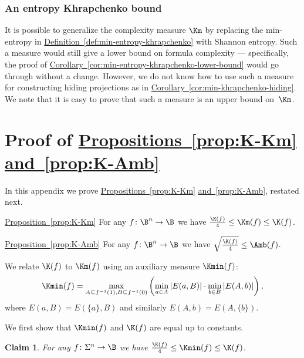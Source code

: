 \documentclass[11pt]{article}
\numberwithin{equation}{section}
\newtheorem{claim}[theorem]{Claim}
\theoremstyle{definition}
\theoremstyle{plain}
\newcommand{\expref}[2]{\hyperref[#2]{#1~\ref{#2}}}
\theoremstyle{definition}\newtheorem{notation}[theorem]{Notation}\theoremstyle{plain}
\begin{document}
%
%
\subsubsection{An entropy Khrapchenko bound}  %

It is possible to generalize the complexity measure $\Km$ by replacing
the min-entropy in \expref{Definition}{def:min-entropy-khrapchenko} 
with Shannon entropy.
Such a measure would still %
give a lower bound on %
formula complexity --- specifically,
the proof of \expref{Corollary}{cor:min-entropy-khrapchenko-lower-bound} 
would go through
without a change. However, we do not know how to use such a measure
for constructing hiding projections as in 
\expref{Corollary}{cor:min-khrapchenko-hiding}.
We note that it is easy to prove that such a measure is an upper bound
on~$\Km$.

\section{\label{sec:K-Km}Proof of \expref{Propositions}{prop:K-Km}
  \expref{and}{prop:K-Amb}}

In this appendix we prove \expref{Propositions}{prop:K-Km}
  \expref{and}{prop:K-Amb}, restated next. 
\begin{restated}{\expref{Proposition}{prop:K-Km}}
For any $f\colon\B^{n}\to\B$ we have $\tfrac{\K(f)}{4}\le\Km(f)\le\K(f)$. 
\end{restated}

\begin{restated}{\expref{Proposition}{prop:K-Amb}}
For any $f\colon\B^{n}\to\B$ we have $\sqrt{\tfrac{\K(f)}{4}}\le\Amb(f)$. 
\end{restated}

We relate $\K(f)$ to $\Km(f)$ using an auxiliary measure $\Kmin(f)$:
\[
\Kmin(f)=\max_{A\subseteq f^{-1}(1),B\subseteq f^{-1}(0)}\left(\min_{a\in A}{|E(a,B)|}\cdot\min_{b\in B}{|E(A,b)|}\right),
\]
where $E(a,B)=E(\{a\},B)$ and similarly $E(A,b)=E(A,\{b\})$.

We first show that $\Kmin(f)$ and $\K(f)$ are equal up to constants.
\begin{claim}
\label{claim:K-Kmin} For any $f\colon\Sigma^{n}\to\B$ we have $\tfrac{\K(f)}{4}\le\Kmin(f)\le\K(f)$. 
\end{claim}
\end{document}
